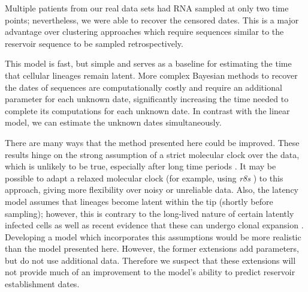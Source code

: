 \documentclass{bmcart}
\begin{document}

Multiple patients from our real data sets had RNA sampled at only two time points; nevertheless, we were able to recover the censored dates.
This is a major advantage over clustering approaches \cite{Buzon14} which require sequences similar to the reservoir sequence to be sampled retrospectively.

This model is fast, but simple and serves as a baseline for estimating the time that cellular lineages remain latent.
More complex Bayesian methods \cite{Shapiro11} to recover the dates of sequences are computationally costly and require an additional parameter for each unknown date, significantly increasing the time needed to complete its computations for each unknown date.
In contrast with the linear model, we can estimate the unknown dates simultaneously.

There are many ways that the method presented here could be improved.
These results hinge on the strong assumption of a strict molecular clock over the data, which is unlikely to be true, especially after long time periods \cite{Shankarappa99}. 
It may be possible to adapt a relaxed molecular clock (for example, using \textit{r8s} \cite{r8ts}) to this approach, giving more flexibility over noisy or unreliable data.
Also, the latency model assumes that lineages become latent within the tip (shortly before sampling); however, this is contrary to the long-lived nature of certain latently infected cells as well as recent evidence that these can undergo clonal expansion \cite{Maldarelli14}.
Developing a model which incorporates this assumptions
would be more realistic than the model presented here.
However, the former extensions add parameters, but do not use additional data.
Therefore we suspect that these extensions will not provide much of an improvement to the model's ability to predict reservoir establishment dates.
\end{document}
